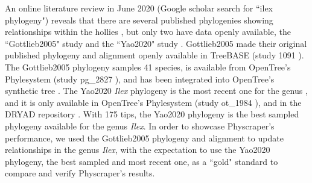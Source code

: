 \documentclass{bmcart}
\begin{document}
An online literature review in June 2020 (Google scholar search for ``ilex phylogeny")
reveals that there are several published phylogenies showing relationships within
the hollies \cite{cuenoud2000molecular, manen2010history, setoguchi2000intersectional,
selbach2009new}, but only two have data openly available, the ``Gottlieb2005" study
\cite{gottlieb2005molecular} and the ``Yao2020" study \cite{yao2020phylogeny}.
Gottlieb2005 made their original published phylogeny and alignment openly available in TreeBASE
(study 1091 \cite{treebase1091}). The Gottlieb2005 phylogeny samples 41 species, is available from
OpenTree's Phylesystem (study pg\_2827 \cite{pg2827}),
and has been integrated into OpenTree's synthetic tree \cite{mrcaott68451ott89474}.
The Yao2020 \textit{Ilex} phylogeny is the most recent one for the genus \cite{yao2020phylogeny},
and it is only available in OpenTree's Phylesystem (study ot\_1984 \cite{ot1984}),
and in the DRYAD repository \cite{yao2020dryad}.
With 175 tips, the Yao2020 phylogeny \cite{yao2020phylogeny} is the best sampled phylogeny available for
the genus \textit{Ilex}.
In order to showcase Physcraper's performance, we used the Gottlieb2005 phylogeny
and alignment to update relationships in the genus \textit{Ilex},
with the expectation to use the Yao2020 phylogeny, the best sampled and most recent
one, as a ``gold" standard to compare and verify Physcraper's results.
\end{document}
